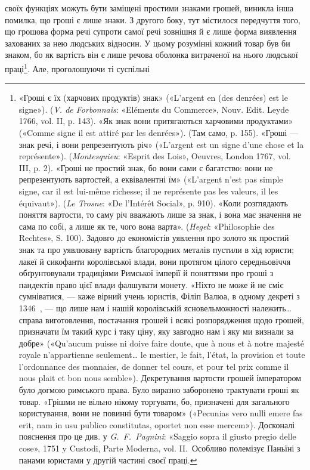 своїх функціях можуть бути заміщені простими знаками грошей,
виникла інша помилка, що гроші є лише знаки. З другого боку,
тут містилося передчуття того, що грошова форма речі супроти
самої речі зовнішня й є лише форма виявлення захованих за нею
людських відносин. У цьому розумінні кожний товар був би
знаком, бо як вартість він є лише речова оболонка витраченої
на нього людської праці\footnote{
«Гроші є їх (харчових продуктів) знак» («L’argent en (des denrées)
est le signe»). (\emph{V. de Forbonnais}: «Eléments du Commerce»,
Nouv. Edit. Leyde 1766, vol. II, p. 143). «Як знак вони притягаються
харчовими продуктами» («Comme signe il est attiré par les denrées»). (Там
само, p. 155). «Гроші — знак речі, і вони репрезентують річ» («L’argent
est un signe d’une chose et la représente»). (\emph{Montesquieu}: «Esprit des
Lois», Oeuvres, London 1767, vol. III, p. 2). «Гроші не простий знак,
бо вони сами є багатство: вони не репрезентують вартостей, а еквівалентні
їм» («L’argent n’est pas simple signe, car il est lui-même richesse; il
ne représente pas les valeurs, il les équivaut»). (\emph{Le Trosne}: «De l’Intérêt
Social», p. 910). «Коли розглядають поняття вартости, то саму річ
вважають лише за знак, і вона має значення не сама по собі, а лише як
те, чого вона варта». (\emph{Hegel}: «Philosophie des Rechtes», S. 100). Задовго
до економістів уявлення про золото як простий знак та про уявлювану
вартість благородних металів пустили в хід юристи; лакеї й сикофанти
королівської влади, вони протягом цілого середньовіччя обґрунтовували
традиціями Римської імперії й поняттями про гроші з пандектів
право цієї влади фалшувати монету. «Ніхто не може й не сміє сумніватися,
— каже вірний учень юристів, Філіп Валюа, в одному декреті з 1346~, —
що лише нам і нашій королівській ясновельможності належить\dots{} справа
виготовлення, постачання грошей і всякі розпорядження щодо грошей,
призначати їм такий курс і таку ціну, яку завгодно нам і яку ми визнали
за добре» («Qu’aucum puisse ni doive faire doute, que à nous et à notre
majesté royale n’appartienne seulement\dots{} le mestier, le fait, l’état, la provision
et toute l’ordonnance des monnaies, de donner tel cours, et pour tel
prix comme il nous plait et bon nous semble»). Декретування вартости
грошей імператором було догмою римського права. Було виразно заборонено
трактувати гроші як товар. «Грішми не вільно нікому торгувати,
бо, призначені для загального користування, вони не повинні бути товаром»
(«Pecunias vero nullі emere fas erit, nam in usu publico constitutas,
oportet non esse mercem»). Досконалі пояснення про це див. у \emph{G.~F.~Pagnini}:
«Saggio sopra il giusto pregio delle cose», 1751 y Custodi, Parte
Moderna, vol. II.~Особливо полемізує Паньїні з панами юристами у другій
частині своєї праці.
}. Але, проголошуючи ті суспільні

